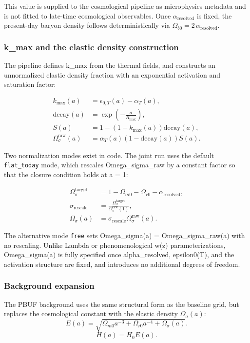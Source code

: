 \documentclass[11pt]{article}
\begin{document}
This value is supplied to the cosmological pipeline as microphysics metadata and is not fitted to late-time cosmological observables.
Once \(\alpha_{\mathrm{resolved}}\) is fixed, the present-day baryon density follows deterministically via \(\Omega_{b0} = 2\,\alpha_{\mathrm{resolved}}\).

\subsubsection{k\_max and the elastic density construction}
The pipeline defines k\_max from the thermal fields, and constructs an unnormalized elastic density fraction with an exponential activation and saturation factor:

\begin{align}
k_{\max}(a) &= \epsilon_{0,T}(a) - \alpha_T(a),\\
\mathrm{decay}(a) &= \exp\left(-\frac{a}{R_{\max}}\right),\\
S(a) &= 1 - \left(1 - k_{\max}(a)\right)\mathrm{decay}(a),\\
\Omega_\sigma^{\mathrm{raw}}(a) &= \alpha_T(a)\left(1 - \mathrm{decay}(a)\right)S(a).
\end{align}

Two normalization modes exist in code. The joint run uses the default \texttt{flat\_today} mode, which rescales Omega\_sigma\_raw by a constant factor so that the closure condition holds at a = 1:

\begin{align}
\Omega_\sigma^{\mathrm{target}} &= 1 - \Omega_{m0} - \Omega_{r0} - \alpha_{\mathrm{resolved}},\\
\sigma_{\mathrm{rescale}} &= \frac{\Omega_\sigma^{\mathrm{target}}}{\Omega_\sigma^{\mathrm{raw}}(1)},\\
\Omega_\sigma(a) &= \sigma_{\mathrm{rescale}}\Omega_\sigma^{\mathrm{raw}}(a).
\end{align}

The alternative mode \texttt{free} sets Omega\_sigma(a) = Omega\_sigma\_raw(a) with no rescaling.
Unlike Lambda or phenomenological w(z) parameterizations, Omega\_sigma(a) is fully specified once alpha\_resolved, epsilon0(T), and the activation structure are fixed, and introduces no additional degrees of freedom.

\subsubsection{Background expansion}
The PBUF background uses the same structural form as the baseline grid, but replaces the cosmological constant with the elastic density \(\Omega_\sigma(a)\):
\begin{equation}
E(a) =
\sqrt{
\Omega_{m0} a^{-3}
+ \Omega_{r0} a^{-4}
+ \Omega_\sigma(a)
}.
\end{equation}
\begin{equation}
H(a) = H_0 E(a).
\end{equation}
\end{document}
